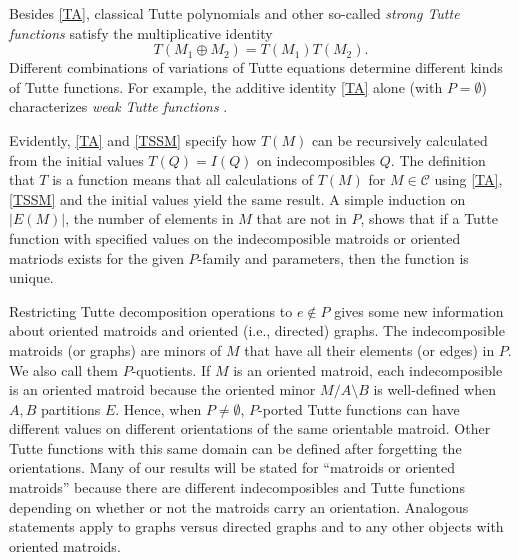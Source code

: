 \documentclass[12pt,leqno]{amsart}
\theoremstyle{remark}
\begin{document}
Besides \eqref{TA}, classical Tutte polynomials and other 
so-called \emph{strong Tutte
functions} \cite{MR93a:05047} satisfy the multiplicative identity
\begin{equation}
\tag{TSM}
\label{TSM}
T(M_1\oplus M_2)=T(M_1)T(M_2).
\end{equation}
Different combinations of variations of Tutte equations determine
different kinds of Tutte functions.  For example, the additive 
identity \eqref{TA} alone (with $P=\emptyset$) characterizes
\emph{weak Tutte functions} \cite{MR93a:05047,ZaslavskyOct18}.

Evidently, \eqref{TA} and \eqref{TSSM} 
specify how $T(M)$ can be recursively calculated from
the initial values $T(Q)=I(Q)$ on indecomposibles $Q$.
The definition that $T$ is a function 
means that
all calculations of $T(M)$ for $M\in\mathcal{C}$
using \eqref{TA}, \eqref{TSSM} and the initial values
yield the same result.
A simple induction on $|E(M)|$,
the number of elements in $M$ that are not in $P$, 
shows that if a Tutte function
with specified values on the indecomposible matroids or oriented matriods
exists for the given $P$-family and parameters, then the function
is unique.  

Restricting Tutte decomposition operations to $e\not\in P$
gives some new information about oriented matroids and
oriented (i.e., directed) graphs.
The indecomposible matroids (or graphs) 
are minors of $M$ that have all their 
elements (or edges) in $P$.  We also call them
$P$-quotients.
If $M$ is an oriented
matroid, each indecomposible is an oriented
matroid because the oriented minor $M/A\setminus B$
is well-defined when $A,B$ partitions $E$.
Hence, when $P\neq \emptyset$, $P$-ported Tutte functions
can have different values on different orientations of the
same orientable matroid.  
Other Tutte functions with this same domain can be defined after
forgetting the orientations.
Many of our results will be stated for ``matroids or
oriented matroids'' because there are different indecomposibles
and Tutte functions depending on whether or 
not the matroids carry an orientation.  Analogous
statements apply to graphs versus directed graphs
and to any other objects with oriented matroids.
\end{document}
